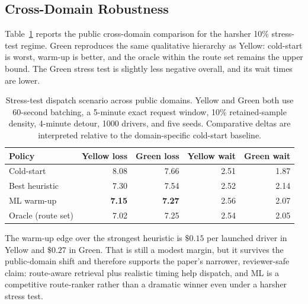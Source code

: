 \documentclass[journal]{IEEEtran}
\begin{document}
\subsection{Cross-Domain Robustness}
Table~\ref{tab:domain_transfer} reports the public cross-domain comparison for the harsher 10\% stress-test regime. Green reproduces the same qualitative hierarchy as Yellow: cold-start is worst, warm-up is better, and the oracle within the route set remains the upper bound. The Green stress test is slightly less negative overall, and its wait times are lower.

\begin{table}[!t]
\caption{Stress-test dispatch scenario across public domains. Yellow and Green both use 60-second batching, a 5-minute exact request window, 10\% retained-sample density, 4-minute detour, 1000 drivers, and five seeds. Comparative deltas are interpreted relative to the domain-specific cold-start baseline.}
\label{tab:domain_transfer}
\centering
\scriptsize
\setlength{\tabcolsep}{2.4pt}
\begin{tabular}{lrrrr}
\toprule
Policy & Yellow loss & Green loss & Yellow wait & Green wait \\
\midrule
Cold-start & 8.08 & 7.66 & 2.51 & 1.87 \\
Best heuristic & 7.30 & 7.54 & 2.52 & 2.14 \\
ML warm-up & \textbf{7.15} & \textbf{7.27} & 2.56 & 2.07 \\
Oracle (route set) & 7.02 & 7.25 & 2.54 & 2.05 \\
\bottomrule
\end{tabular}
\end{table}

The warm-up edge over the strongest heuristic is \(\$0.15\) per launched driver in Yellow and \(\$0.27\) in Green. That is still a modest margin, but it survives the public-domain shift and therefore supports the paper's narrower, reviewer-safe claim: route-aware retrieval plus realistic timing help dispatch, and ML is a competitive route-ranker rather than a dramatic winner even under a harsher stress test.
\end{document}
